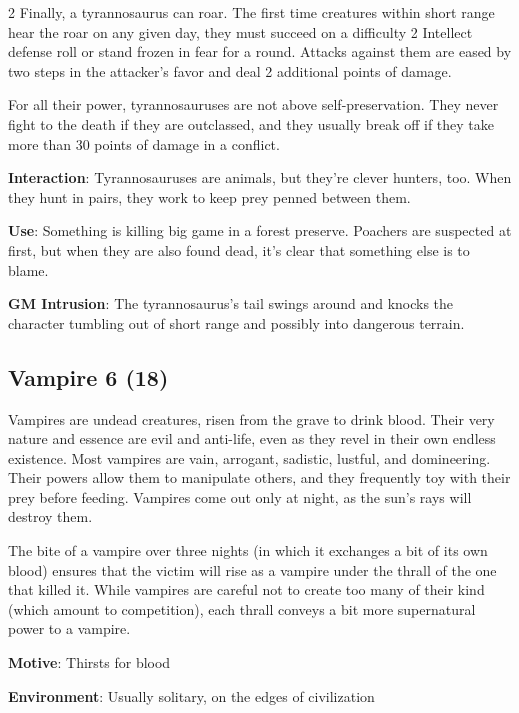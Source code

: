 \begin{multicols}{2}
Finally, a tyrannosaurus can roar. The first time creatures within short range hear the roar on any given day, they must succeed on a difficulty 2 Intellect defense roll or stand frozen in fear for a round. Attacks against them are eased by two steps in the attacker’s favor and deal 2 additional points of damage.

For all their power, tyrannosauruses are not above self-preservation. They never fight to the death if they are outclassed, and they usually break off if they take more than 30 points of damage in a conflict.

\textbf{Interaction}: Tyrannosauruses are animals, but they’re clever hunters, too. When they hunt in pairs, they work to keep prey penned between them. 

\textbf{Use}: Something is killing big game in a forest preserve. Poachers are suspected at first, but when they are also found dead, it’s clear that something else is to blame.

\textbf{GM Intrusion}: The tyrannosaurus’s tail swings around and knocks the character tumbling out of short range and possibly into dangerous terrain.

\subsection{Vampire	6 (18)}

Vampires are undead creatures, risen from the grave to drink blood. Their very nature and essence are evil and anti-life, even as they revel in their own endless existence. Most vampires are vain, arrogant, sadistic, lustful, and domineering. Their powers allow them to manipulate others, and they frequently toy with their prey before feeding. Vampires come out only at night, as the sun’s rays will destroy them.

The bite of a vampire over three nights (in which it exchanges a bit of its own blood) ensures that the victim will rise as a vampire under the thrall of the one that killed it. While vampires are careful not to create too many of their kind (which amount to competition), each thrall conveys a bit more supernatural power to a vampire. 

\textbf{Motive}: Thirsts for blood

\textbf{Environment}: Usually solitary, on the edges of civilization


\end{multicols}

